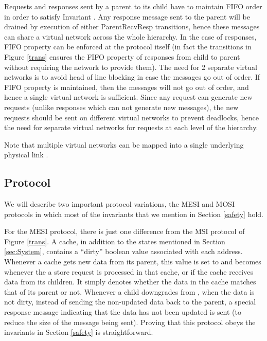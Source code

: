 Requests and responses sent by a parent to its child have to maintain FIFO
order in order to satisfy Invariant . Any response message sent
to the parent will be drained by execution of either ParentRecvResp
transitions, hence these messages can share a virtual network across the whole
hierarchy. In the case of responses, FIFO property can be enforced at the
protocol itself (in fact the transitions in Figure \ref{trans} ensures the FIFO
property of responses from child to parent without requiring the network to
provide them). The need for 2 separate virtual networks is to avoid head of
line blocking in case the messages go out of order. If FIFO property is
maintained, then the messages will not go out of order, and hence a single
virtual network is sufficient.  Since any request can generate new requests
(unlike responses which can not generate new messages), the new requests should
be sent on different virtual networks to prevent deadlocks, hence the need for
separate virtual networks for requests at each level of the hierarchy.

Note that multiple virtual networks can be mapped into a single underlying
physical link \cite{noc-funda}.


\subsection{Protocol}
We will describe two important protocol variations, the MESI and MOSI protocols
in which most of the invariants that we mention in Section \ref{safety} hold.

For the MESI protocol, there is just one difference from the MSI protocol of
Figure \ref{trans}. A cache, in addition to the states mentioned in Section
\ref{sec:System}, contains a ``dirty'' boolean value associated with each
address.  Whenever a cache gets new data from its parent, this value is set to
\False{} and becomes \True{} whenever the a store request is processed in that
cache, or if the cache receives data from its children. It simply denotes
whether the data in the cache matches that of its parent or not.  Whenever a
child downgrades from \Mo{}, when the data is not dirty, instead of sending the
non-updated data back to the parent, a special response message indicating that
the data has not been updated is sent (to reduce the size of the message being
sent). Proving that this protocol obeys the invariants in Section \ref{safety}
is straightforward.

